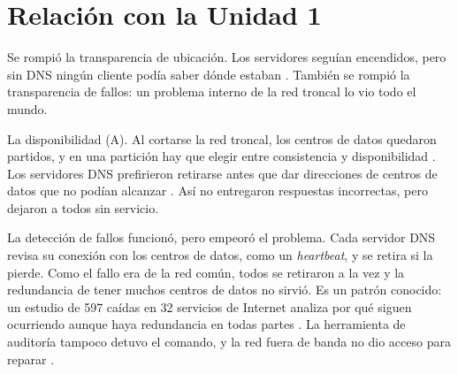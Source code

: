 \section{Relación con la Unidad 1}

\begin{description}[leftmargin=0pt,itemsep=2pt,topsep=2pt]
  \item[Transparencia rota.] Se rompió la transparencia de ubicación. Los servidores seguían encendidos, pero sin DNS ningún cliente podía saber dónde estaban \cite{meta_detalles}. También se rompió la transparencia de fallos: un problema interno de la red troncal lo vio todo el mundo.
  \item[Propiedad de CAP sacrificada.] La disponibilidad (A). Al cortarse la red troncal, los centros de datos quedaron partidos, y en una partición hay que elegir entre consistencia y disponibilidad \cite{brewer2012}. Los servidores DNS prefirieron retirarse antes que dar direcciones de centros de datos que no podían alcanzar \cite{meta_detalles}. Así no entregaron respuestas incorrectas, pero dejaron a todos sin servicio.
  \item[Tolerancia a fallos que falló.] La detección de fallos funcionó, pero empeoró el problema. Cada servidor DNS revisa su conexión con los centros de datos, como un \emph{heartbeat}, y se retira si la pierde. Como el fallo era de la red común, todos se retiraron a la vez y la redundancia de tener muchos centros de datos no sirvió. Es un patrón conocido: un estudio de 597 caídas en 32 servicios de Internet analiza por qué siguen ocurriendo aunque haya redundancia en todas partes \cite{gunawi2016}. La herramienta de auditoría tampoco detuvo el comando, y la red fuera de banda no dio acceso para reparar \cite{meta_detalles}.
\end{description}
